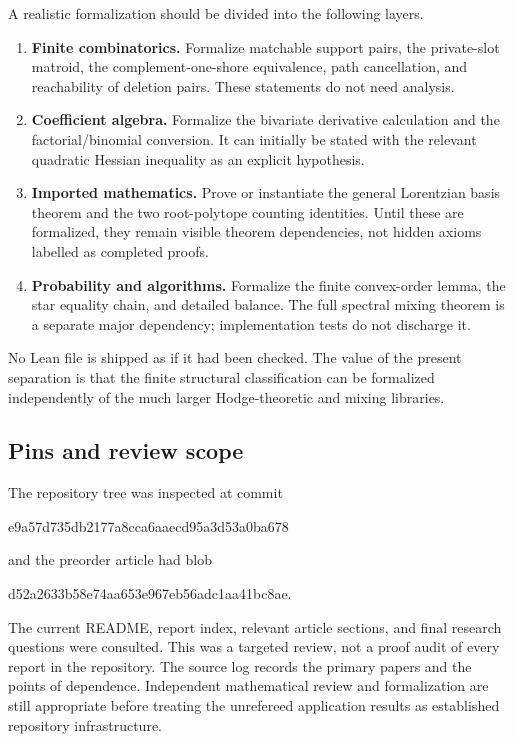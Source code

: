 \documentclass[11pt]{article}
\numberwithin{equation}{section}
\theoremstyle{definition}
\begin{document}
A realistic formalization should be divided into the following layers.
\begin{enumerate}[leftmargin=1.8em]
\item \textbf{Finite combinatorics.} Formalize matchable support pairs, the
private-slot matroid, the complement-one-shore equivalence, path cancellation,
and reachability of deletion pairs. These statements do not need analysis.
\item \textbf{Coefficient algebra.} Formalize the bivariate derivative
calculation and the factorial/binomial conversion. It can initially be stated
with the relevant quadratic Hessian inequality as an explicit hypothesis.
\item \textbf{Imported mathematics.} Prove or instantiate the general
Lorentzian basis theorem and the two root-polytope counting identities. Until
these are formalized, they remain visible theorem dependencies, not hidden
axioms labelled as completed proofs.
\item \textbf{Probability and algorithms.} Formalize the finite convex-order
lemma, the star equality chain, and detailed balance. The full spectral mixing
theorem is a separate major dependency; implementation tests do not discharge it.
\end{enumerate}

No Lean file is shipped as if it had been checked. The value of the present
separation is that the finite structural classification can be formalized
independently of the much larger Hodge-theoretic and mixing libraries.

\subsection{Pins and review scope}
\label{lor:sec:pins}
The repository tree was inspected at commit
\begin{center}\small\ttfamily
 e9a57d735db2177a8cca6aaecd95a3d53a0ba678
\end{center}
and the preorder article had blob
\begin{center}\small\ttfamily
 d52a2633b58e74aa653e967eb56adc1aa41bc8ae.
\end{center}
The current README, report index, relevant article sections, and final
research questions were consulted. This was a targeted review, not a
proof audit of every report in the repository. The source log records the
primary papers and the points of dependence. Independent mathematical
review and formalization are still appropriate before treating the
unrefereed application results as established repository infrastructure.
\end{document}
